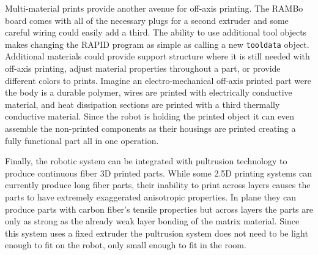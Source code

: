 \documentclass[main.tex]{subfiles}
\begin{document}
Multi-material prints provide another avenue for off-axis printing.
The RAMBo board comes with all of the necessary plugs for a second extruder and some careful wiring could easily add a third.
The ability to use additional tool objects makes changing the RAPID program as simple as calling a new \texttt{tooldata} object.
Additional materials could provide support structure where it is still needed with off-axis printing, adjust material properties throughout a part, or provide different colors to prints.
Imagine an electro-mechanical off-axis printed part were the body is a durable polymer, wires are printed with electrically conductive material, and heat dissipation sections are printed with a third thermally conductive material.
Since the robot is holding the printed object it can even assemble the non-printed components as their housings are printed creating a fully functional part all in one operation.

Finally, the robotic system can be integrated with pultrusion technology to produce continuous fiber 3D printed parts.
While some 2.5D printing systems can currently produce long fiber parts, their inability to print across layers causes the parts to have extremely exaggerated anisotropic properties.
In plane they can produce parts with carbon fiber's tensile properties but across layers the parts are only as strong as the already weak layer bonding of the matrix material.
Since this system uses a fixed extruder the pultrusion system does not need to be light enough to fit on the robot, only small enough to fit in the room.
\end{document}
